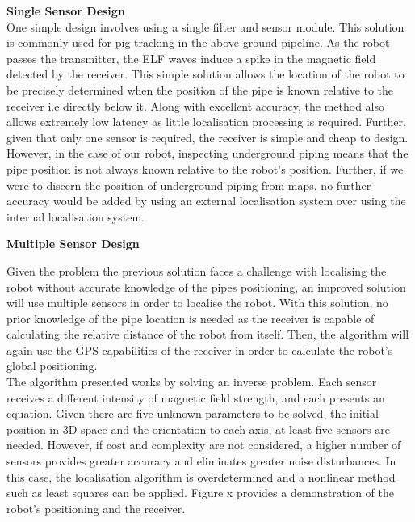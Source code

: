 \documentclass[11pt]{article}		%
\begin{document}
			\textbf{Single Sensor Design}\\
			One simple design involves using a single filter and sensor module. This solution is commonly used for pig tracking in the above ground pipeline. As the robot passes the transmitter, the ELF waves induce a spike in the magnetic field detected by the receiver. This simple solution allows the location of the robot to be precisely determined when the position of the pipe is known relative to the receiver i.e directly below it. Along with excellent accuracy, the method also allows extremely low latency as little localisation processing is required. Further, given that only one sensor is required, the receiver is simple and cheap to design. \\
	    	\hspace*{3ex}However, in the case of our robot, inspecting underground piping means that the pipe position is not always known relative to the robot's position. Further, if we were to discern the position of underground piping from maps, no further accuracy would be added by using an external localisation system over using the internal localisation system. 
	
	        \textbf{Multiple Sensor Design}
			
			Given the problem the previous solution faces a challenge with localising the robot without accurate knowledge of the pipes positioning, an improved solution will use multiple sensors in order to localise the robot. With this solution, no prior knowledge of the pipe location is needed as the receiver is capable of calculating the relative distance of the robot from itself. Then, the algorithm will again use the GPS capabilities of the receiver in order to calculate the robot's global positioning. \\
			
			\hspace*{3ex}The algorithm presented works by solving an inverse problem. Each sensor receives a different intensity of magnetic field strength, and each presents an equation. Given there are five unknown parameters to be solved, the initial position in 3D space and the orientation to each axis, at least five sensors are needed. However, if cost and complexity are not considered, a higher number of sensors provides greater accuracy and eliminates greater noise disturbances. In this case, the localisation algorithm is overdetermined and a nonlinear method such as least squares can be applied. Figure x provides a demonstration of the robot's positioning and the receiver.\\
			
\end{document}

